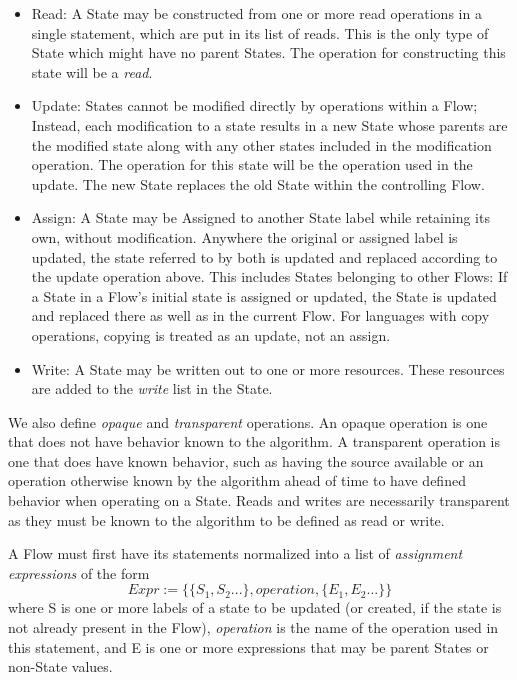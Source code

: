 \documentclass{llncs}
\newcommand{\+}{\discretionary{\mbox{${\bm\cdot}\mkern-1mu$}}{}{}}
\begin{document}
\begin{itemize}
    \item Read: A State may be constructed from one or more read operations in a single statement, which are put in its list of reads. This is the only type of State which might have no parent States. The operation for constructing this state will be a \textit{read}.
    \item Update: States cannot be modified directly by operations within a Flow; Instead, each modification to a state results in a new State whose parents are the modified state along with any other states included in the modification operation. The operation for this state will be the operation used in the update. The new State replaces the old State within the controlling Flow.
    \item Assign: A State may be Assigned to another State label while retaining its own, without modification. Anywhere the original or assigned label is updated, the state referred to by both is updated and replaced according to the update operation above. This includes States belonging to other Flows: If a State in a Flow's initial state is assigned or updated, the State is updated and replaced there as well as in the current Flow. For languages with copy operations, copying is treated as an update, not an assign.
    \item Write: A State may be written out to one or more resources. These resources are added to the \textit{write} list in the State.
\end{itemize}

We also define \textit{opaque} and \textit{transparent} operations. An opaque operation is one that
does not have behavior known to the algorithm. A transparent operation is one that does have known
behavior, such as having the source available or an operation otherwise known by the algorithm 
ahead of time to have defined behavior when operating on a State. Reads and writes are necessarily
transparent as they must be known to the algorithm to be defined as read or write.

A Flow must first have its statements normalized into a list of \textit{assignment expressions} 
of the form \[Expr := \{\{S_1, S_2...\}, operation, \{E_1, E_2...\}\}\] where S is one or more
labels of a state to be updated (or created, if the state is not already present in the Flow), 
\textit{operation} is the name of the operation used in this statement, and E is one or more 
expressions that may be parent States or non-State values.
\end{document}
